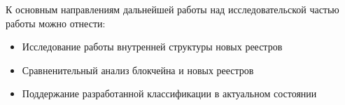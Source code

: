 К основным направлениям дальнейшей работы над исследовательской частью работы
можно отнести:
\begin{itemize}
    \item Исследование работы внутренней структуры новых реестров
    \item Сравненительный анализ блокчейна и новых реестров
    \item Поддержание разработанной классификации в актуальном состоянии
\end{itemize}

